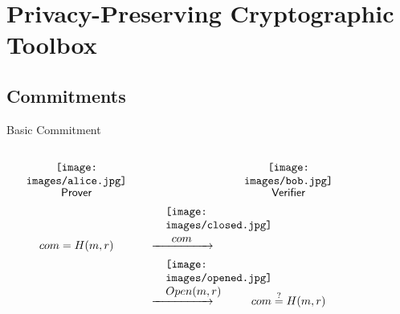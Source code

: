 
    \section{Privacy-Preserving Cryptographic Toolbox}
     \frame{\sectionpage}

     \subsection{Commitments}
     
 \begin{frame}{Basic Commitment}
 
  {
  
  $
    \begin{array}{c c c}
&&\\
         
\begin{minipage}{4cm}
\begin{center}
 \texttt{[image: images/alice.jpg]}
 \end{center}
\end{minipage}
&&
     
\begin{minipage}{4cm}
\begin{center}
 \texttt{[image: images/bob.jpg]}
 \end{center}
\end{minipage}
\\
\text{\textsf{Prover}} & & \text{\textsf{Verifier}} \\
com = H(m,r) &  \xrightarrow{\hspace{1em}
\begin{minipage}{1cm}
\begin{center}
 \texttt{[image: images/closed.jpg]}
 \vspace{0.05cm} $com$
 \end{center} 
\end{minipage}  \hspace{1em}} & \\

 & \xrightarrow{\hspace{1em}
\begin{minipage}{1cm}
\begin{center}
 \texttt{[image: images/opened.jpg]}
 \vspace{0.05cm} $Open(m,r)$
 \end{center} 
\end{minipage}  \hspace{1em}} &  com \stackrel{?}{=}H(m,r)

\end{array}$
  }

\end{frame}
